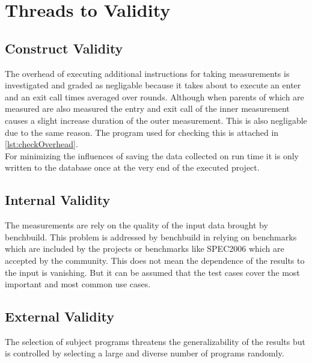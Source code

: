 \section{Threads to Validity}
\subsection{Construct Validity}
The overhead of executing additional instructions for taking measurements is investigated and graded as negligable because it takes about \measurementOverhead to execute an enter and an exit call \overheadIterations times averaged over \overheadRounds rounds.
Although when parents of \scops which are measured are also measured the entry and exit call of the inner measurement causes a slight increase duration of the outer measurement.
This is also negligable due to the same reason.
The program used for checking this is attached in \autoref{lst:checkOverhead}.\\
For minimizing the influences of saving the data collected on run time it is only written to the database once at the very end of the executed project.\\
\subsection{Internal Validity}
The measurements are rely on the quality of the input data brought by benchbuild.
This problem is addressed by benchbuild in relying on benchmarks which are included by the projects or benchmarks like SPEC2006 which are accepted by the community.
This does not mean the dependence of the results to the input is vanishing.
But it can be assumed that the test cases cover the most important and most common use cases.
\subsection{External Validity}
The selection of subject programs threatens the generalizability of the results but is controlled by selecting a large and diverse number of programs randomly.
